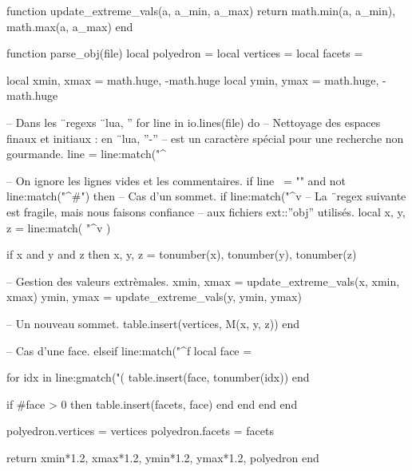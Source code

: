 \documentclass{standalone}
\begin{document}
\begin{luacode}
function update_extreme_vals(a, a_min, a_max)
  return math.min(a, a_min), math.max(a, a_max)
end

function parse_obj(file)
  local polyedron = {}
  local vertices  = {}
  local facets    = {}

  local xmin, xmax = math.huge, -math.huge
  local ymin, ymax = math.huge, -math.huge

-- Dans les ¨regexs ¨lua, ''%
  for line in io.lines(file) do
-- Nettoyage des espaces finaux et initiaux : en ¨lua, ''-''
-- est un caractère spécial pour une recherche non gourmande.
    line = line:match("^%

-- On ignore les lignes vides et les commentaires.
    if line ~= "" and not line:match("^#") then
-- Cas d'un sommet.
      if line:match("^v%
-- La ¨regex suivante est fragile, mais nous faisons confiance
-- aux fichiers ext::''obj'' utilisés.
        local x, y, z = line:match(
          "^v%
        )

        if x and y and z then
          x, y, z = tonumber(x), tonumber(y), tonumber(z)

-- Gestion des valeurs extrèmales.
          xmin, xmax = update_extreme_vals(x, xmin, xmax)
          ymin, ymax = update_extreme_vals(y, ymin, ymax)

-- Un nouveau sommet.
          table.insert(vertices, M(x, y, z))
        end

-- Cas d'une face.
      elseif line:match("^f%
        local face = {}

        for idx in line:gmatch("(%
          table.insert(face, tonumber(idx))
        end

        if #face > 0 then
          table.insert(facets, face)
        end
      end
    end
  end

  polyedron.vertices = vertices
  polyedron.facets   = facets

  return {xmin*1.2, xmax*1.2, ymin*1.2, ymax*1.2}, polyedron
end
\end{luacode}
\end{document}
